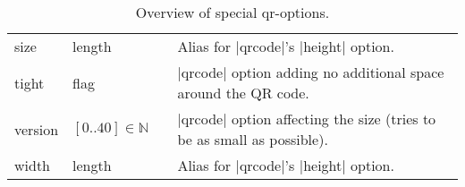 \documentclass[parskip=half,english,numbers=noenddot,footnotes=nomultiple,oneside]{scrartcl}
\begin{document}
\begin{savenotes}
\begin{table}
\begin{tabular}{>{\ttfamily}ll>{\ttfamily}cp{.5\linewidth}}
		size            & length  &          & Alias for |qrcode|'s |height| option.                        \\
		tight           & flag    &          & |qrcode| option adding no additional space around the QR code.                                                    \\
		version         & \([0..40] \in \mathbb{N}\) &   0      & |qrcode| option affecting the size (tries to be as small as possible).                                             \\
		width           & length  &          & Alias for |qrcode|'s |height| option.                        \\
		\bottomrule
	\end{tabular}
	\caption{Overview of special qr-options.}
	\label{tbl:extra-keys}
\end{table}
\end{savenotes}
\end{document}
